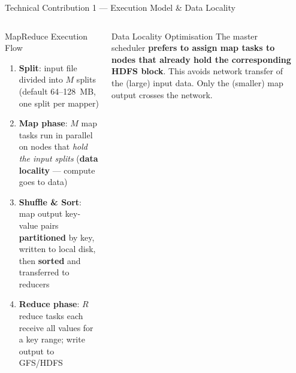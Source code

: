 \documentclass[aspectratio=169,10pt]{beamer}
\begin{document}
\begin{frame}{Technical Contribution 1 — Execution Model \& Data Locality}
  \begin{columns}[T]
      \begin{block}{MapReduce Execution Flow}
        \begin{enumerate}
          \item \textbf{Split}: input file divided into $M$ splits
                (default 64--128~MB, one split per mapper)
          \item \textbf{Map phase}: $M$ map tasks run in parallel
                on nodes that \emph{hold the input splits}
                (\textbf{data locality} — compute goes to data)
          \item \textbf{Shuffle \& Sort}: map output key-value pairs
                \textbf{partitioned} by key, written to local disk,
                then \textbf{sorted} and transferred to reducers
          \item \textbf{Reduce phase}: $R$ reduce tasks each receive
                all values for a key range; write output to GFS/HDFS
        \end{enumerate}
      \end{block}
      \vspace{4pt}
      \begin{alertblock}{Data Locality Optimisation}
        The master scheduler \textbf{prefers to assign map tasks
        to nodes that already hold the corresponding HDFS block}.
        This avoids network transfer of the (large) input data.
        Only the (smaller) map output crosses the network.
      \end{alertblock}

      \begin{center}
\end{center}
\end{columns}
\end{frame}
\end{document}
